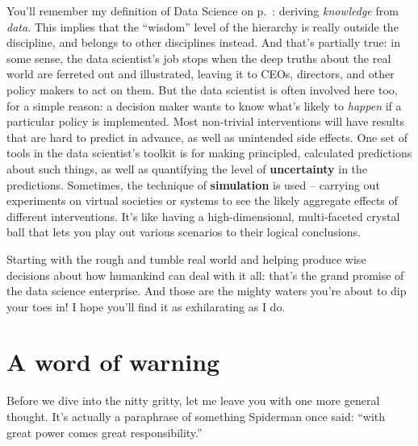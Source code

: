 You'll remember my definition of Data Science on p.~\pageref{dsDefinition}:
deriving \textit{knowledge} from \textit{data}. This implies that the
``wisdom'' level of the hierarchy is really outside the discipline, and belongs
to other disciplines instead. And that's partially true: in some sense, the
data scientist's job stops when the deep truths about the real world are
ferreted out and illustrated, leaving it to CEOs, directors, and other policy
makers to act on them. But the data scientist is often involved here too, for a
simple reason: a decision maker wants to know what's likely to \textit{happen}
if a particular policy is implemented. Most non-trivial interventions will have
results that are hard to predict in advance, as well as unintended side
effects. One set of tools in the data scientist's toolkit is for making
principled, calculated predictions about such things, as well as quantifying
the level of \textbf{uncertainty} in the predictions. Sometimes, the technique
of \textbf{simulation} is used -- carrying out experiments on virtual societies
or systems to see the likely aggregate effects of different interventions. It's
like having a high-dimensional, multi-faceted crystal ball that lets you play
out various scenarios to their logical conclusions.

\bigskip

Starting with the rough and tumble real world and helping produce wise
decisions about how humankind can deal with it all: that's the grand promise of
the data science enterprise. And those are the mighty waters you're about to
dip your toes in! I hope you'll find it as exhilarating as I do.



\section{A word of warning}


Before we dive into the nitty gritty, let me leave you with one more general
thought. It's actually a paraphrase of something Spiderman once said: ``with
great power comes great responsibility.''


